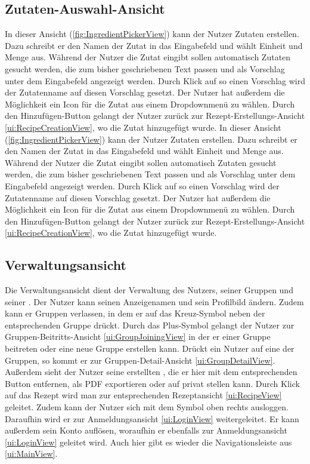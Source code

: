 \documentclass[parskip=full]{scrartcl}
\begin{document}
\subsection{Zutaten-Auswahl-Ansicht}
\label{ui:IngredientPickerView}
In dieser Ansicht (\autoref{fig:IngredientPickerView}) kann der Nutzer Zutaten erstellen. Dazu schreibt er den Namen der Zutat in das Eingabefeld und wählt Einheit und Menge aus. Während der Nutzer die Zutat eingibt sollen automatisch Zutaten gesucht werden, die zum bisher geschriebenen Text passen und als Vorschlag unter dem Eingabefeld angezeigt werden. Durch Klick auf so einen Vorschlag wird der Zutatenname auf diesen Vorschlag gesetzt. Der Nutzer hat außerdem die Möglichkeit ein Icon für die Zutat aus einem Dropdownmenü zu wählen. Durch den Hinzufügen-Button gelangt der Nutzer zurück zur Rezept-Erstellungs-Ansicht \ref{ui:RecipeCreationView}, wo die Zutat hinzugefügt wurde.
In dieser Ansicht (\autoref{fig:IngredientPickerView}) kann der Nutzer Zutaten erstellen. Dazu schreibt er den Namen der Zutat in das Eingabefeld und wählt Einheit und Menge aus. Während der Nutzer die Zutat eingibt sollen automatisch Zutaten gesucht werden, die zum bisher geschriebenen Text passen und als Vorschlag unter dem Eingabefeld angezeigt werden. Durch Klick auf so einen Vorschlag wird der Zutatenname auf diesen Vorschlag gesetzt. Der Nutzer hat außerdem die Möglichkeit ein Icon für die Zutat aus einem Dropdownmenü zu wählen. Durch den Hinzufügen-Button gelangt der Nutzer zurück zur Rezept-Erstellungs-Ansicht \ref{ui:RecipeCreationView}, wo die Zutat hinzugefügt wurde.


\subsection{Verwaltungsansicht}
\label{ui:SettingsView}
Die Verwaltungsansicht dient der Verwaltung des Nutzers, seiner Gruppen und seiner . Der Nutzer kann seinen Anzeigenamen und sein Profilbild ändern. Zudem kann er Gruppen verlassen, in dem er auf das Kreuz-Symbol neben der entsprechenden Gruppe drückt. Durch das Plus-Symbol gelangt der Nutzer zur Gruppen-Beitritts-Ansicht \ref{ui:GroupJoiningView} in der er einer Gruppe beitreten oder eine neue Gruppe erstellen kann. Drückt ein Nutzer auf eine der Gruppen, so kommt er zur Gruppen-Detail-Ansicht \ref{ui:GroupDetailView}. Außerdem sieht der Nutzer seine erstellten , die er hier mit dem entsprechenden Button entfernen, als PDF exportieren oder auf privat stellen kann. Durch Klick auf das Rezept wird man zur entsprechenden Rezeptansicht \ref{ui:RecipeView} geleitet.
Zudem kann der Nutzer sich mit dem Symbol oben rechts ausloggen. Daraufhin wird er zur Anmeldungsansicht \ref{ui:LoginView} weitergeleitet. Er kann außerdem sein Konto auflösen, woraufhin er ebenfalls zur Anmeldungsansicht \ref{ui:LoginView} geleitet wird. Auch hier gibt es wieder die Navigationsleiste aus \ref{ui:MainView}.
\end{document}
